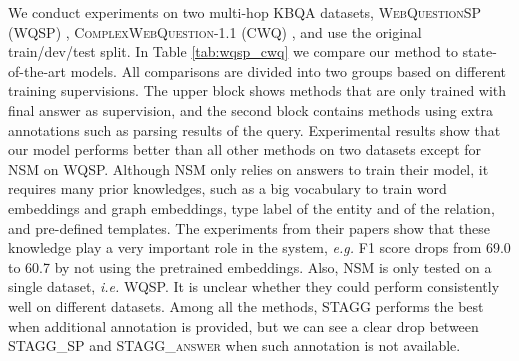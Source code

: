 We conduct experiments on two multi-hop KBQA datasets, \textsc{WebQuestionSP} (WQSP) \cite{DBLP:conf/acl/YihCHG15}, \textsc{ComplexWebQuestion}-1.1 (CWQ) \cite{DBLP:journals/corr/abs-1807-09623}, and use the original train/dev/test split. In Table \ref{tab:wqsp_cwq} we compare our method to state-of-the-art models. All comparisons are divided into two groups based on different training supervisions. The upper block shows methods that are only trained with final answer as supervision, and the second block contains methods using extra annotations such as parsing results of the query. Experimental results show that our model performs better than all other methods on two datasets except for NSM \cite{DBLP:conf/acl/LiangBLFL17} on WQSP. Although NSM only relies on answers to train their model, it requires many prior knowledges, such as a big vocabulary to train word embeddings and graph embeddings, type label of the entity and of the relation, and pre-defined templates. The experiments from their papers show that these knowledge play a very important role in the system, \emph{e.g.} F1 score drops from 69.0 to 60.7 by not using the pretrained embeddings. %
 Also, NSM is only tested on a single dataset, \emph{i.e.} WQSP. It is unclear whether they could perform consistently well on different datasets. Among all the methods, \textsc{STAGG} performs the best when additional annotation is provided, but we can see a clear drop between \textsc{STAGG\_SP} and \textsc{STAGG\_answer} when such annotation is not available.








